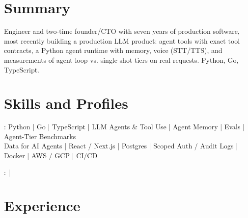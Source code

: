 \documentclass[print]{jack-resume}
\begin{document}
\pagecolor{darkmodeBackground}


\begin{minipage}[t][1cm][t]{.03\textwidth}
    \hfill
\end{minipage}

\section{Summary}
Engineer and two-time founder/CTO with seven years of production software, most recently building a production LLM product: agent tools with exact tool contracts, a Python agent runtime with memory, voice (STT/TTS), and measurements of agent-loop vs. single-shot tiers on real requests. Python, Go, TypeScript.
\sectionsep

\section{Skills and Profiles}
:
Python \hfill | \hfill
Go \hfill | \hfill
TypeScript \hfill | \hfill
LLM Agents \& Tool Use \hfill | \hfill
Agent Memory \hfill | \hfill
Evals \hfill | \hfill
Agent-Tier Benchmarks \\
\hspace{1.0cm} Data for AI Agents \hfill | \hfill
React / Next.js \hfill | \hfill
Postgres \hfill | \hfill
Scoped Auth / Audit Logs \hfill | \hfill
Docker \hfill | \hfill
AWS / GCP \hfill | \hfill
CI/CD \\

\raggedright{
    :
      \href{https://www.linkedin.com/in/jack-sturtevant/}{ \ExternalLink} |
     \href{https://github.com/jacksturt}{ \ExternalLink}}

\section{Experience}
\end{document}
